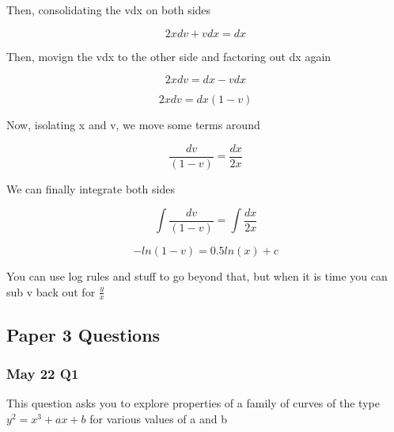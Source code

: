 \documentclass[../main.tex]{subfiles}
\begin{document}
Then, consolidating the vdx on both sides

\[ 2xdv + vdx = dx \]

Then, movign the vdx to the other side and factoring out dx again


\[ 2xdv= dx - vdx \]

\[ 2xdv= dx(1 - v) \]

Now, isolating x and v, we move some terms around


\[ \frac{dv}{(1-v)} = \frac{dx}{2x} \]

We can finally integrate both sides


\[ \int{\frac{dv}{(1-v)}} = \int{\frac{dx}{2x}} \]

\[ -ln(1-v) = 0.5 ln(x) + c \]

You can use log rules and stuff to go beyond that, but when it is time you can sub v back out for $\frac{y}{x}$ 


\subsection{Paper 3 Questions}

\subsubsection{May 22 Q1}

This question asks you to explore properties of a family of curves of the type $y^2 = x^3 + ax + b$ for various values of a and b
\end{document}
